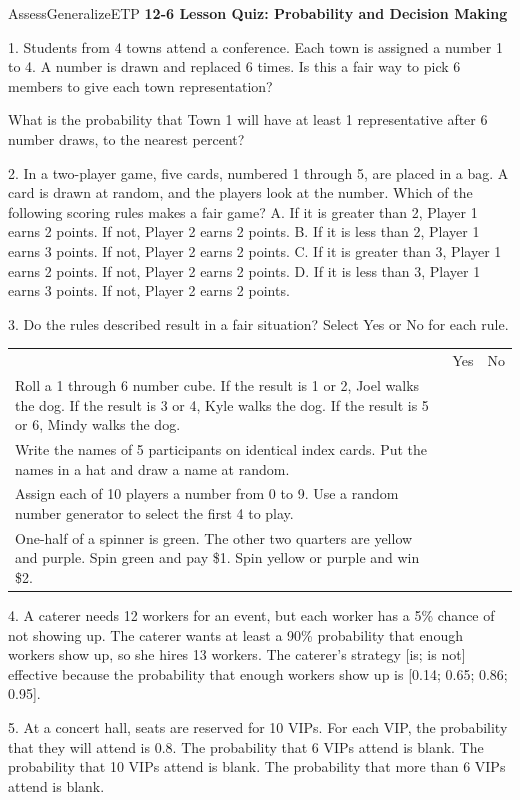 \documentclass{article}
\newenvironment{te-addendum}[2]{}{}     %
\newcommand{\answer}[1]{}               %
\newcommand{\te}[1]{}                   %
\begin{document}
\begin{te-addendum}{Assess}{GeneralizeETP}
\textbf{12-6 Lesson Quiz: Probability and Decision Making}
\te{Assessment. Lesson Quiz is available at SavvasRealize.com. ASSESSMENT RESOURCES. Name. enVision Algebra 2. SavvasRealize.com.}
1. Students from 4 towns attend a conference. Each town is assigned a number 1 to 4.
A number is drawn and replaced 6 times. Is this a fair way to pick 6 members to give each town representation?
\answer{1. no}
What is the probability that Town 1 will have at least 1 representative after 6 number draws, to the nearest percent?
\answer{82\%}
2. In a two-player game, five cards, numbered 1 through 5, are placed in a bag. A card is drawn at random, and the players look at the number. Which of the following scoring rules makes a fair game?
A. If it is greater than 2, Player 1 earns 2 points. If not, Player 2 earns 2 points.
B. If it is less than 2, Player 1 earns 3 points. If not, Player 2 earns 2 points.
C. If it is greater than 3, Player 1 earns 2 points. If not, Player 2 earns 2 points.
D. If it is less than 3, Player 1 earns 3 points. If not, Player 2 earns 2 points.
\answer{2. D}
3. Do the rules described result in a fair situation? Select Yes or No for each rule.
\begin{tabular}{lll}
 & Yes & No \\
Roll a 1 through 6 number cube. If the result is 1 or 2, Joel walks the dog. If the result is 3 or 4, Kyle walks the dog. If the result is 5 or 6, Mindy walks the dog. & \answer{Yes} & \\
Write the names of 5 participants on identical index cards. Put the names in a hat and draw a name at random. & \answer{Yes} & \\
Assign each of 10 players a number from 0 to 9. Use a random number generator to select the first 4 to play. & \answer{Yes} & \\
One-half of a spinner is green. The other two quarters are yellow and purple. Spin green and pay \$1. Spin yellow or purple and win \$2. & & \answer{No} \\
\end{tabular}
4. A caterer needs 12 workers for an event, but each worker has a 5\% chance of not showing up. The caterer wants at least a 90\% probability that enough workers show up, so she hires 13 workers.
The caterer's strategy [is; is not] effective because the probability that enough workers show up is [0.14; 0.65; 0.86; 0.95].
\answer{4. is not; 0.86}
5. At a concert hall, seats are reserved for 10 VIPs. For each VIP, the probability that they will attend is 0.8. The probability that 6 VIPs attend is blank. The probability that 10 VIPs attend is blank. The probability that more than 6 VIPs attend is blank.
\answer{5. 0.088; 0.107; 0.879}
\te{enVision Algebra 2 • Assessment Sourcebook. Copyright © Savvas Learning Company LLC. All Rights Reserved.}
\end{te-addendum}
\end{document}
